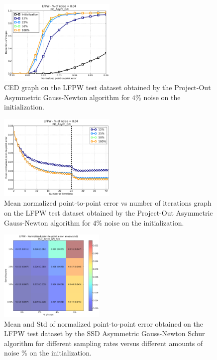 \begin{figure}[h!]
    \centering
    \includegraphics[width=0.50\textwidth]{experiments/noise_vs_sampling/po_asymmetric_gn/ced_po_asymmetric_gn_4.png}
    \caption{CED graph on the LFPW test dataset obtained by the Project-Out Asymmetric Gauss-Newton algorithm for $4$\% noise on the initialization.}
    \label{fig:ced_po_asymmetric_gn_4}
\end{figure}

\begin{figure}[h!]
    \centering
    \includegraphics[width=0.50\textwidth]{experiments/noise_vs_sampling/po_asymmetric_gn/mean_error_vs_iters_po_asymmetric_gn_4.png}
    \caption{Mean normalized point-to-point error vs number of iterations graph on the LFPW test dataset obtained by the Project-Out Asymmetric Gauss-Newton algorithm for $4$\% noise on the initialization.}
    \label{fig:mean_error_vs_iters_po_asymmetric_gn_4}
\end{figure}

\begin{figure}[h!]
    \centering
    \includegraphics[width=0.45\textwidth]{experiments/noise_vs_sampling/ssd_asymmetric_gn/noise_vs_sampling_ssd_asymmetric.png}
    \caption{Mean and Std of normalized point-to-point error obtained on the LFPW test dataset by the SSD Asymmetric Gauss-Newton Schur algorithm for different sampling rates versus different amounts of noise \% on the initialization.}
    \label{fig:noise_vs_sampling_ssd_asymmetric}
\end{figure}

